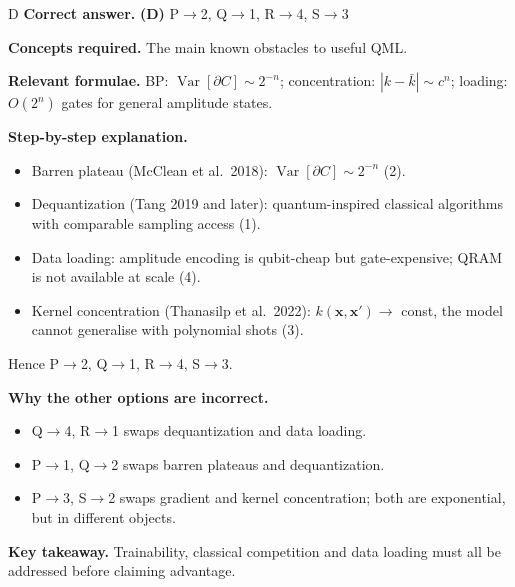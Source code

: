 \documentclass[11pt,a4paper]{article}
\newcommand{\qsep}{\par\vspace{2pt}{\color{black!15}\hrule}\vspace{4pt}}
\begin{document}
\begin{solbox}{D}
\textbf{\color{brand}Correct answer.} \textcolor{okgreen}{\textbf{(D)}} P$\to$2, Q$\to$1, R$\to$4, S$\to$3

\textbf{\color{brand}Concepts required.} The main known obstacles to useful QML.

\textbf{\color{brand}Relevant formulae.} BP: $\operatorname{Var}[\partial C] \sim 2^{-n}$; concentration: $|k - \bar k| \sim c^{n}$; loading: $O(2^n)$ gates for general amplitude states.

\textbf{\color{brand}Step-by-step explanation.} \begin{itemize}\itemsep0pt
\item Barren plateau (McClean et al.\ 2018): $\operatorname{Var}[\partial C] \sim 2^{-n}$ (2).
\item Dequantization (Tang 2019 and later): quantum-inspired classical algorithms with comparable sampling access (1).
\item Data loading: amplitude encoding is qubit-cheap but gate-expensive; QRAM is not available at scale (4).
\item Kernel concentration (Thanasilp et al.\ 2022): $k(\mathbf x, \mathbf x') \to$ const, the model cannot generalise with polynomial shots (3).
\end{itemize}
Hence P$\to$2, Q$\to$1, R$\to$4, S$\to$3.

\textbf{\color{brand}Why the other options are incorrect.}
\begin{itemize}[leftmargin=2.4em, itemsep=1pt, topsep=2pt]
\item[\textbf{(A)}] Q$\to$4, R$\to$1 swaps dequantization and data loading.
\item[\textbf{(B)}] P$\to$1, Q$\to$2 swaps barren plateaus and dequantization.
\item[\textbf{(C)}] P$\to$3, S$\to$2 swaps gradient and kernel concentration; both are exponential, but in different objects.
\end{itemize}
\textbf{\color{brand}Key takeaway.} Trainability, classical competition and data loading must all be addressed before claiming advantage.
\end{solbox}
\qsep
\end{document}
